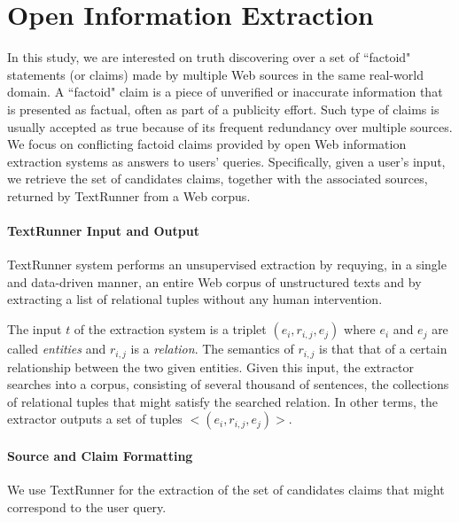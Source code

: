 \section{Open Information Extraction}

In this study, we are interested on truth discovering over a set of ``factoid" statements
(or claims) made by multiple Web sources in the same real-world domain. A ``factoid" claim is
a piece of unverified or inaccurate information that is presented as factual, often
as part of a publicity effort. Such type of claims  is usually accepted as true  because of its
frequent redundancy over multiple sources. We focus on conflicting factoid claims provided by open
Web information extraction systems as answers to users' queries. Specifically, given a user's input, 
we retrieve the set of candidates claims, together with the associated sources, returned by TextRunner
from a Web corpus. 



\paragraph*{TextRunner Input and Output}
TextRunner system performs an unsupervised extraction by requying, in a single and data-driven manner,
an entire Web corpus of unstructured texts and by extracting a list of relational tuples without 
any human intervention.

The input $t$ of the extraction system is a triplet $(e_i, r_{i,j}, e_j)$ where $e_i$ and $e_j$ are called
\emph{entities} and $r_{i,j}$ is a \emph{relation}. The semantics of $r_{i,j}$ is that that of a certain 
relationship between the two given entities. Given this input, the extractor searches into a corpus, consisting
of several thousand of sentences, the collections of relational tuples that might satisfy the searched relation.
In other terms, the extractor outputs a set of tuples $<(e_i, r_{i,j}, e_j)>$.

\paragraph*{Source and Claim Formatting}
We use TextRunner for the extraction of the set of 
candidates claims that might correspond to the user query.